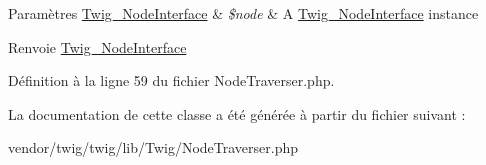 \begin{DoxyParams}[1]{Paramètres}
\hyperlink{interface_twig___node_interface}{Twig\+\_\+\+Node\+Interface} & {\em \$node} & A \hyperlink{interface_twig___node_interface}{Twig\+\_\+\+Node\+Interface} instance\\
\hline
\end{DoxyParams}
\begin{DoxyReturn}{Renvoie}
\hyperlink{interface_twig___node_interface}{Twig\+\_\+\+Node\+Interface} 
\end{DoxyReturn}


Définition à la ligne 59 du fichier Node\+Traverser.\+php.



La documentation de cette classe a été générée à partir du fichier suivant \+:\begin{DoxyCompactItemize}
\item 
vendor/twig/twig/lib/\+Twig/Node\+Traverser.\+php\end{DoxyCompactItemize}
